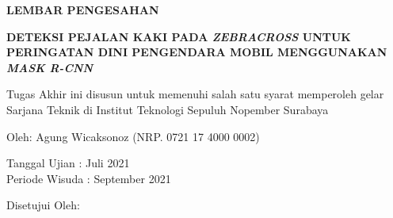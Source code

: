 \begin{center}
	\large
  \textbf{LEMBAR PENGESAHAN}
\end{center}

\thispagestyle{empty}

\begin{center}
  \textbf{DETEKSI PEJALAN KAKI PADA \textit{ZEBRACROSS} UNTUK PERINGATAN DINI PENGENDARA MOBIL MENGGUNAKAN \textit{MASK R-CNN}}
\end{center}

\begingroup
  \small

  \begin{center}
    Tugas Akhir ini disusun untuk memenuhi salah satu syarat memperoleh gelar Sarjana Teknik di Institut Teknologi Sepuluh Nopember Surabaya
  \end{center}

  \begin{center}
    Oleh: Agung Wicaksonoz (NRP. 0721 17 4000 0002)
  \end{center}

  \begin{center}
    Tanggal Ujian :  Juli 2021\\
    Periode Wisuda : September 2021
  \end{center}

  \begin{center}
    Disetujui Oleh:
  \end{center}

  \begingroup
    \setlength{\tabcolsep}{0pt}

